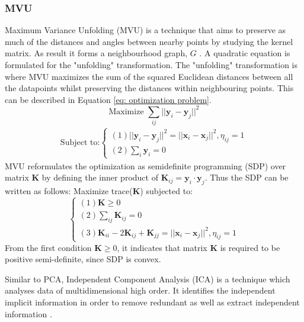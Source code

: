\documentclass[11pt,twocolumn]{witseiepaper}
\begin{document}
	\subsubsection{MVU}
	Maximum Variance Unfolding (MVU) is a technique that aims to preserve as much of the distances and angles between nearby points by studying the kernel matrix. As result it forms a neighbourhood graph, $G$ \cite{Jiang2011}. A quadratic equation is formulated for the "unfolding" transformation. The "unfolding" transformation is where MVU maximizes the sum of the squared Euclidean distances between all the datapoints whilst preserving the distances within neighbouring points. This can be described in Equation \ref{eq: optimization problem}.
	\begin{equation}
		\text{Maximize } \sum_{ij}||\textbf{y}_i - \textbf{y}_j||^{2}
		\label{eq: optimization problem}
	\end{equation}
	\begin{align*}
		\text{Subject to:}
		\begin{cases}
			(1)||\textbf{y}_i - \textbf{y}_j||^{2} = ||\textbf{x}_i - \textbf{x}_j||^{2} , \eta_{ij} = 1 \\
			(2)\sum_{i}\textbf{y}_i = 0
		\end{cases}
	\end{align*}
	MVU reformulates the optimization as semidefinite programming (SDP) over matrix $\textbf{K}$ by defining the inner product of $\textbf{K}_{ij} = \textbf{y}_i \cdot \textbf{y}_j$. Thus the SDP can be written as follows: 
	\newline
	Maximize trace(\textbf{K}) subjected to:
	\begin{equation}
		\begin{cases}
			(1) \textbf{K} \geq 0 \\
			(2) \sum_{ij} \textbf{K}_{ij} = 0 \\
			(3) \textbf{K}_{ii} - 2\textbf{K}_{ij} + \textbf{K}_{jj} = ||\textbf{x}_i - \textbf{x}_j||^{2}, \eta_{ij} = 1
		\end{cases}
	\end{equation} 
	From the first condition $\textbf{K} \geq 0$, it indicates that matrix $\textbf{K}$ is required to be positive semi-definite, since SDP is convex.
	
	Similar to PCA, Independent Component Analysis (ICA) is a technique which analyses data of multidimensional high order. It identifies the independent implicit information in order to remove redundant as well as extract independent information \cite{7852869}. 
	
\end{document}

